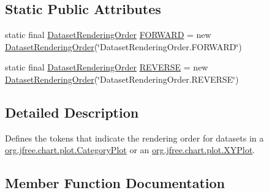 \subsection*{Static Public Attributes}
\begin{DoxyCompactItemize}
\item 
static final \mbox{\hyperlink{classorg_1_1jfree_1_1chart_1_1plot_1_1_dataset_rendering_order}{Dataset\+Rendering\+Order}} \mbox{\hyperlink{classorg_1_1jfree_1_1chart_1_1plot_1_1_dataset_rendering_order_a51d0b3e1edb8c40f874e76a0d510041a}{F\+O\+R\+W\+A\+RD}} = new \mbox{\hyperlink{classorg_1_1jfree_1_1chart_1_1plot_1_1_dataset_rendering_order}{Dataset\+Rendering\+Order}}(\char`\"{}Dataset\+Rendering\+Order.\+F\+O\+R\+W\+A\+RD\char`\"{})
\item 
static final \mbox{\hyperlink{classorg_1_1jfree_1_1chart_1_1plot_1_1_dataset_rendering_order}{Dataset\+Rendering\+Order}} \mbox{\hyperlink{classorg_1_1jfree_1_1chart_1_1plot_1_1_dataset_rendering_order_ae7a6e721ca1531a5a616f7854471a5c9}{R\+E\+V\+E\+R\+SE}} = new \mbox{\hyperlink{classorg_1_1jfree_1_1chart_1_1plot_1_1_dataset_rendering_order}{Dataset\+Rendering\+Order}}(\char`\"{}Dataset\+Rendering\+Order.\+R\+E\+V\+E\+R\+SE\char`\"{})
\end{DoxyCompactItemize}


\subsection{Detailed Description}
Defines the tokens that indicate the rendering order for datasets in a \mbox{\hyperlink{classorg_1_1jfree_1_1chart_1_1plot_1_1_category_plot}{org.\+jfree.\+chart.\+plot.\+Category\+Plot}} or an \mbox{\hyperlink{classorg_1_1jfree_1_1chart_1_1plot_1_1_x_y_plot}{org.\+jfree.\+chart.\+plot.\+X\+Y\+Plot}}. 

\subsection{Member Function Documentation}
\mbox{\label{classorg_1_1jfree_1_1chart_1_1plot_1_1_dataset_rendering_order_a75f2a2e5082fd0d4888c405bd9f4dd4a}} 
